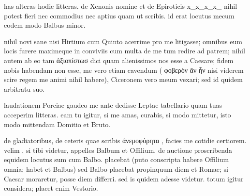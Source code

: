 


 has alteras hodie litteras. de Xenonis nomine et de Epiroticis x_x_x_x_ nihil potest fieri nec commodius nec aptius quam ut scribis. id erat locutus mecum eodem modo Balbus minor.

 nihil novi sane nisi Hirtium cum Quinto acerrime pro me litigasse; omnibus eum locis furere maximeque in conviviis cum multa de me tum redire ad patrem; nihil autem ab eo tam ἀξιοπίστωσ dici quam alienissimos nos esse a Caesare; fidem nobis habendam non esse, me vero etiam cavendum ( φοβερὸν ἂν ἦν nisi viderem scire regem me animi nihil habere), Ciceronem vero meum vexari; sed id quidem arbitratu suo.

 laudationem Porciae gaudeo me ante dedisse Leptae tabellario quam tuas acceperim litteras. eam tu igitur, si me amas, curabis, si modo mittetur, isto modo mittendam Domitio et Bruto.

 de gladiatoribus, de ceteris quae scribis ἀνεμοφόρητα , facies me cotidie certiorem. velim , si tibi videtur, appelles Balbum et Offilium. de auctione proscribenda equidem locutus sum cum Balbo. placebat (puto conscripta habere Offilium omnia; habet et Balbus) sed Balbo placebat propinquum diem et Romae; si Caesar moraretur, posse diem differri. sed is quidem adesse videtur. totum igitur considera; placet enim Vestorio.
